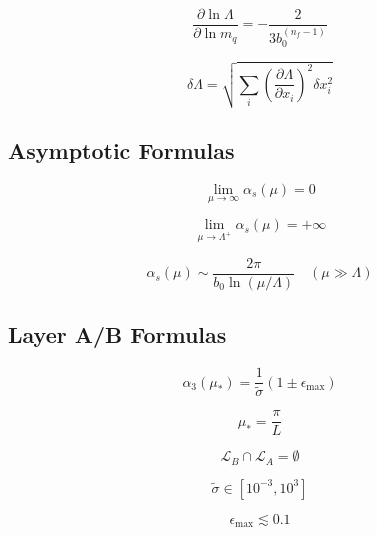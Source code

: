 \documentclass[11pt,a4paper]{article}
\theoremstyle{definition}
\begin{document}
\begin{equation}
\label{eq:cat-37}
\frac{\partial\ln\Lambda}{\partial\ln m_q} = -\frac{2}{3b_0^{(n_f-1)}}
\end{equation}

\begin{equation}
\label{eq:cat-38}
\delta\Lambda = \sqrt{\sum_i\left(\frac{\partial\Lambda}{\partial x_i}\right)^2\delta x_i^2}
\end{equation}

\subsection{Asymptotic Formulas}
\label{subsec:cat-asymp}

\begin{equation}
\label{eq:cat-39}
\lim_{\mu\to\infty}\alpha_s(\mu) = 0
\end{equation}

\begin{equation}
\label{eq:cat-40}
\lim_{\mu\to\Lambda^+}\alpha_s(\mu) = +\infty
\end{equation}

\begin{equation}
\label{eq:cat-41}
\alpha_s(\mu) \sim \frac{2\pi}{b_0\ln(\mu/\Lambda)} \quad (\mu \gg \Lambda)
\end{equation}

\subsection{Layer A/B Formulas}
\label{subsec:cat-layer}

\begin{equation}
\label{eq:cat-42}
\alpha_3(\mu_*) = \frac{1}{\tilde{\sigma}}(1 \pm \epsilon_{\max})
\end{equation}

\begin{equation}
\label{eq:cat-43}
\mu_* = \frac{\pi}{L}
\end{equation}

\begin{equation}
\label{eq:cat-44}
\mathcal{L}_B \cap \mathcal{L}_A = \emptyset
\end{equation}

\begin{equation}
\label{eq:cat-45}
\tilde{\sigma} \in [10^{-3}, 10^3]
\end{equation}

\begin{equation}
\label{eq:cat-46}
\epsilon_{\max} \lesssim 0.1
\end{equation}
\end{document}
